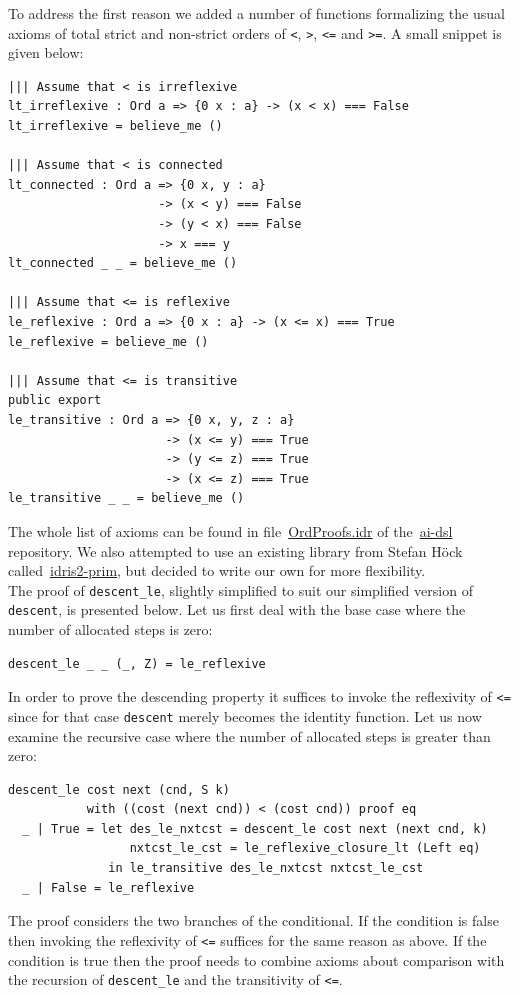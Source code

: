\documentclass[]{report}
\begin{document}
To address the first reason we added a number of functions formalizing
the usual axioms of total strict and non-strict orders of \texttt{<},
\texttt{>}, \texttt{<=} and \texttt{>=}.  A small snippet is given
below:
\begin{verbatim}
||| Assume that < is irreflexive
lt_irreflexive : Ord a => {0 x : a} -> (x < x) === False
lt_irreflexive = believe_me ()

||| Assume that < is connected
lt_connected : Ord a => {0 x, y : a}
                     -> (x < y) === False
                     -> (y < x) === False
                     -> x === y
lt_connected _ _ = believe_me ()

||| Assume that <= is reflexive
le_reflexive : Ord a => {0 x : a} -> (x <= x) === True
le_reflexive = believe_me ()

||| Assume that <= is transitive
public export
le_transitive : Ord a => {0 x, y, z : a}
                      -> (x <= y) === True
                      -> (y <= z) === True
                      -> (x <= z) === True
le_transitive _ _ = believe_me ()
\end{verbatim}
The whole list of axioms can be found in
file~\href{https://github.com/singnet/ai-dsl/blob/master/experimental/ai-algorithms/descent/Search/OrdProofs.idr}{OrdProofs.idr}
of the~\href{https://github.com/singnet/ai-dsl}{ai-dsl} repository.
We also attempted to use an existing library from Stefan H\"ock
called~\href{https://github.com/stefan-hoeck/idris2-prim}{idris2-prim},
but decided to write our own for more flexibility.\\

The proof of \texttt{descent\_le}, slightly simplified to suit our
simplified version of \texttt{descent}, is presented below.  Let us
first deal with the base case where the number of allocated steps is
zero:
\begin{verbatim}
descent_le _ _ (_, Z) = le_reflexive
\end{verbatim}
In order to prove the descending property it suffices to invoke the
reflexivity of \texttt{<=} since for that case \texttt{descent} merely
becomes the identity function.  Let us now examine the recursive case
where the number of allocated steps is greater than zero:
\begin{verbatim}
descent_le cost next (cnd, S k)
           with ((cost (next cnd)) < (cost cnd)) proof eq
  _ | True = let des_le_nxtcst = descent_le cost next (next cnd, k)
                 nxtcst_le_cst = le_reflexive_closure_lt (Left eq)
              in le_transitive des_le_nxtcst nxtcst_le_cst
  _ | False = le_reflexive
\end{verbatim}
The proof considers the two branches of the conditional.  If the
condition is false then invoking the reflexivity of \texttt{<=}
suffices for the same reason as above.  If the condition is true then
the proof needs to combine axioms about comparison with the recursion
of \texttt{descent\_le} and the transitivity of \texttt{<=}.
\end{document}
